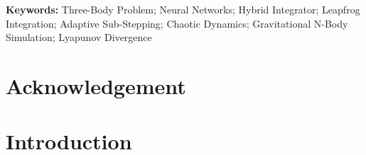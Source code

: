 \documentclass[12pt]{article}
\begin{document}
\vspace{0.5cm}
\noindent\textbf{Keywords:} Three-Body Problem; Neural Networks; Hybrid Integrator;
Leapfrog Integration; Adaptive Sub-Stepping; Chaotic Dynamics; Gravitational N-Body Simulation; Lyapunov Divergence

\newpage
\thispagestyle{plain}

\section*{Acknowledgement}

\vspace{3cm}

%
%

\newpage
{}
{}



\newpage
\renewcommand{\contentsname}{Table of Contents}
\tableofcontents

\newpage
{}
\setcounter{page}{1}

\section{Introduction}
\label{sec:intro}
\end{document}
